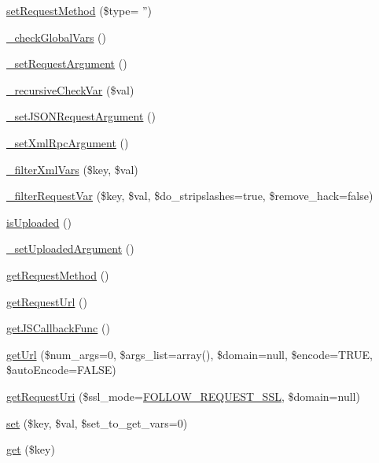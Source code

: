 \begin{DoxyCompactItemize}
\hyperlink{classContext_aa47d184757d451009f0597153d323ccc}{set\-Request\-Method} (\$type= '')
\item 
\hyperlink{classContext_a8030f7c76467bfcec812be76f55571cd}{\-\_\-check\-Global\-Vars} ()
\item 
\hyperlink{classContext_acfc274753d9687732458bfaba540c120}{\-\_\-set\-Request\-Argument} ()
\item 
\hyperlink{classContext_aae89f13e0d99577a6cb8a3bac584cee1}{\-\_\-recursive\-Check\-Var} (\$val)
\item 
\hyperlink{classContext_ae07924273ca1b17fe67a7cf978d762fc}{\-\_\-set\-J\-S\-O\-N\-Request\-Argument} ()
\item 
\hyperlink{classContext_abaa9eeef192a9e4b48a06d0af9b1fd05}{\-\_\-set\-Xml\-Rpc\-Argument} ()
\item 
\hyperlink{classContext_a8104d3bb19322baf793f4a3cc0aad078}{\-\_\-filter\-Xml\-Vars} (\$key, \$val)
\item 
\hyperlink{classContext_afa0ad18053694a2c1e90e558c46226ca}{\-\_\-filter\-Request\-Var} (\$key, \$val, \$do\-\_\-stripslashes=true, \$remove\-\_\-hack=false)
\item 
\hyperlink{classContext_a65ee4d61d0211c8a3f0eeb4251c85892}{is\-Uploaded} ()
\item 
\hyperlink{classContext_a9c821f96670ef47c7139bafc6b39091b}{\-\_\-set\-Uploaded\-Argument} ()
\item 
\hyperlink{classContext_a6912ff86e08ef782a296b77ff1307481}{get\-Request\-Method} ()
\item 
\hyperlink{classContext_ace7f220a4d945de0172f0c1fc98fe31e}{get\-Request\-Url} ()
\item 
\hyperlink{classContext_ab2e157a87d2b960d78b2c3f35ae7da23}{get\-J\-S\-Callback\-Func} ()
\item 
\hyperlink{classContext_aa60b75d32d4923bb3b9854985a82ce36}{get\-Url} (\$num\-\_\-args=0, \$args\-\_\-list=array(), \$domain=null, \$encode=T\-R\-U\-E, \$auto\-Encode=F\-A\-L\-S\-E)
\item 
\hyperlink{classContext_aa79578cfccee4d7f7c4890dc6e36ff90}{get\-Request\-Uri} (\$ssl\-\_\-mode=\hyperlink{Context_8class_8php_a546ef85538017b41b2928e818066989d}{F\-O\-L\-L\-O\-W\-\_\-\-R\-E\-Q\-U\-E\-S\-T\-\_\-\-S\-S\-L}, \$domain=null)
\item 
\hyperlink{classContext_a9f79aa7aecf2e4d8006e517844523fc2}{set} (\$key, \$val, \$set\-\_\-to\-\_\-get\-\_\-vars=0)
\item 
\hyperlink{classContext_a90ce25d65fe6c9778421cbb36ab3def5}{get} (\$key)

\end{DoxyCompactItemize}
